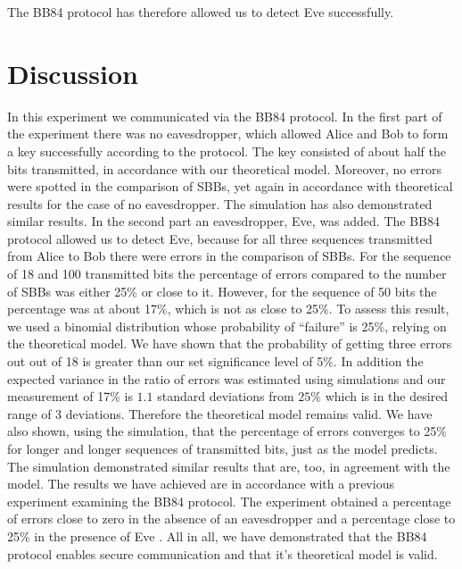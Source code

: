 \documentclass[reprint,amsmath,amssymb,aps, prl,superscriptaddress]{revtex4-2}
\begin{document}
The BB84 protocol has therefore allowed us to detect Eve successfully.

\part*{Discussion}

In this experiment we communicated via the BB84 protocol. In the first part of the experiment there was no eavesdropper, which allowed Alice and Bob to form a key successfully according to the protocol. The key consisted of about half the bits transmitted, in accordance with our theoretical model. Moreover, no errors were spotted in the comparison of SBBs, yet again in accordance with theoretical results for the case of no eavesdropper. The simulation has also demonstrated similar results. In the second part an eavesdropper, Eve, was added. The BB84 protocol allowed us to detect Eve, because for all three sequences transmitted from Alice to Bob there were errors in the comparison of SBBs. For the sequence of 18 and 100 transmitted bits the percentage of errors compared to the number of SBBs was either 25\% or close to it. However, for the sequence of 50 bits the percentage was at about 17\%, which is not as close to 25\%. To assess this result, we used a binomial distribution whose probability of ``failure'' is 25\%, relying on the theoretical model. We have shown that the probability of getting three errors out out of 18 is greater than our set significance level of 5\%. In addition the expected variance in the ratio of errors was estimated using simulations and our measurement of 17\% is $1.1$ standard deviations from $25\%$ which is in the desired range of $3$ deviations. Therefore the theoretical model remains valid. We have also shown, using the simulation, that the percentage of errors converges to 25\% for longer and longer sequences of transmitted bits, just as the model predicts. The simulation demonstrated similar results that are, too, in agreement with the model. The results we have achieved are in accordance with a previous experiment examining the BB84 protocol. The experiment obtained a percentage of errors close to zero in the absence of an eavesdropper and a percentage close to 25\% in the presence of Eve \cite{9225317}. All in all, we have demonstrated that the BB84 protocol enables secure communication and that it's theoretical model is valid. 



\end{document}
